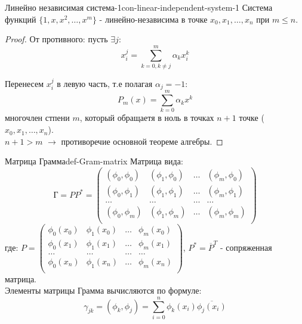 \documentclass[14pt]{extarticle}
\begin{document}
    \begin{consequence}{Линейно независимая система-1}{con-linear-independent-system-1}
        Система функций $\{1, x, x^{2}, \ldots, x^{m}\}$ - линейно-независима в точке $x_{0}, x_{1}, \ldots, x_{n}$ при $m \leq n$.

        \begin{proof}
            От противного: пусть $\exists j$:
            $$x_{i}^{j} = \sum_{k=0, k \neq j}^{m} \alpha_{k} x_{i}^{k}$$
            
            Перенесем $x_{i}^{j}$ в левую часть, т.е полагая $\alpha_{j} = -1$:
            $$P_{m}(x) = \sum_{k = 0}^{m}\alpha_{k} x^{k}$$
            многочлен стпени $m$, который обращаетя в ноль в точках $n+1$ точке ($x_{0}, x_{1}, \ldots, x_{n}$).\\
            $n+1 > m$ $\rightarrow$ противоречие основной теореме алгебры.
        \end{proof}
    \end{consequence}

    \begin{definition}{Матрица Грамма}{def-Gram-matrix}
        Матрица вида:
        $$
        \text{Г} = PP^{*} = \begin{pmatrix}
        (\phi_{0}, \phi_{0}) & (\phi_{1}, \phi_{0}) & \ldots & (\phi_{m}, \phi_{0})\\    
        (\phi_{0}, \phi_{1}) & (\phi_{1}, \phi_{1}) & \ldots & (\phi_{m}, \phi_{1})\\
        \ldots & \ldots & \ldots & \ldots\\
        (\phi_{0}, \phi_{m}) & (\phi_{1}, \phi_{m}) & \ldots & (\phi_{m}, \phi_{m})\\
        \end{pmatrix}
        $$
        где: $
        P = \begin{pmatrix}
            \phi_{0}(x_{0}) & \phi_{1}(x_{0}) & \ldots & \phi_{m}(x_{0})\\
            \phi_{0}(x_{1}) & \phi_{1}(x_{1}) & \ldots & \phi_{m}(x_{1})\\
            \ldots & \ldots & \ldots & \ldots\\
            \phi_{0}(x_{n}) & \phi_{1}(x_{n}) & \ldots & \phi_{m}(x_{n})\\
        \end{pmatrix}    
        $, $P^{*} = \overline{P}^{T}$ - сопряженная матрица.\\

        Элементы матрицы Грамма вычисляются по формуле:
        $$\gamma_{jk} = (\phi_{k}, \phi_{j}) = \sum_{i=0}^{n}\phi_{k}(x_{i})\overline{\phi_{j}(x_{i})}$$
    \end{definition}
\end{document}
